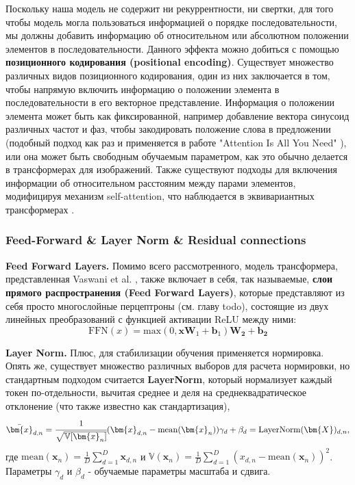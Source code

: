 Поскольку наша модель не содержит ни рекуррентности, ни свертки, для того чтобы 
модель могла пользоваться информацией о порядке последовательности, мы должны 
добавить информацию об относительном или абсолютном положении элементов 
в последовательности. Данного эффекта можно добиться с помощью \textbf{позиционного 
кодирования (positional encoding)}. Существует множество различных видов 
позиционного кодирования, один из них заключается в том, чтобы напрямую включить 
информацию о положении элемента в последовательности в его векторное представление. 
Информация о положении элемента может быть как фиксированной, например 
добавление вектора синусоид различных частот и фаз, чтобы закодировать положение 
слова в предложении (подобный подход как раз и применяется в работе "Attention Is All You Need" 
\cite{vaswani2017attention}), или она может быть свободным обучаемым параметром, 
как это обычно делается в трансформерах для изображений. Также существуют подходы для 
включения информации об относительном расстояним между парами элементов, модифицируя 
механизм self-attention, что наблюдается в эквивариантных трансформерах \cite{turner_transformers_intro}.

\subsubsection{Feed-Forward \& Layer Norm \& Residual connections}

\textbf{Feed Forward Layers. \quad}
Помимо всего рассмотренного, модель трансформера, представленная 
Vaswani et al. \cite{vaswani2017attention}, также включает в себя, так 
называемые, \textbf{слои прямого распространения (Feed Forward Layers)}, которые 
представляют из себя просто многослойные перцептроны (см. главу {\color{red} todo}), 
состоящие из двух линейных преобразований с функцией активации ReLU между ними:
\begin{equation*}
    \text{FFN}(x) = \text{max}(0, \bm{x}\bm{W}_1 + \bm{b}_1)\bm{W_2} + \bm{b_2}
\end{equation*}

\textbf{Layer Norm. \quad}
Плюс, для стабилизации обучения применяется нормировка. Опять же, существует 
множество различных выборов для расчета нормировки, но стандартным подходом считается 
\textbf{LayerNorm}, который нормализует каждый токен по-отдельности, вычитая среднее и 
деля на среднеквадратическое отклонение (что также известно как стандартизация),
\begin{equation*}
    \bar{\bm{x}}_{d,n} = \cfrac{1}{\sqrt{\mathbb{V}[\bm{x}_n]}} 
    (\bm{x}_{d,n} - \text{mean}(\bm{x}_n)) 
    \gamma_d + \beta_d = \text{LayerNorm}(\bm{X})_{d, n},
\end{equation*}
где $\text{mean}(\bm{x}_n) = \frac{1}{D} \sum_{d=1}^D \bm{x}_{d,n}$ и 
$\mathbb{V}(\bm{x}_n) = \frac{1}{D} \sum_{d=1}^D (x_{d,n} - \text{mean}(\bm{x}_n))^2$. 
Параметры $\gamma_d$ и $\beta_d$ - обучаемые параметры масштаба и сдвига.

